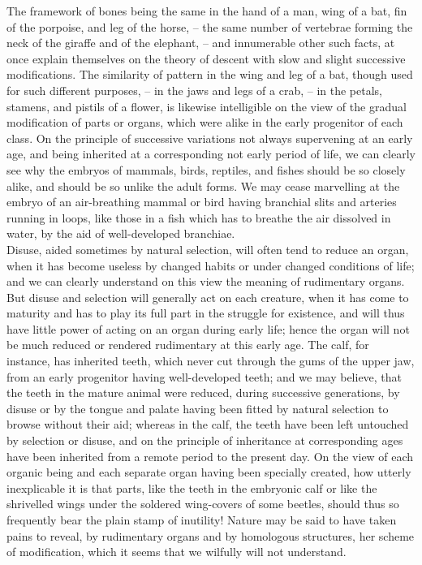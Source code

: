 \indent The framework of bones being the same in the hand of a man, wing of a bat, fin of the porpoise, and leg of the horse, -- the same number of vertebrae forming the neck of the giraffe and of the elephant, -- and innumerable other such facts, at once explain themselves on the theory of descent with slow and slight successive modifications. The similarity of pattern in the wing and leg of a bat, though used for such different purposes, -- in the jaws and legs of a crab, -- in the petals, stamens, and pistils of a flower, is likewise intelligible on the view of the gradual modification of parts or organs, which were alike in the early progenitor of each class. On the principle of successive variations not always supervening at an early age, and being inherited at a corresponding not early period of life, we can clearly see why the embryos of mammals, birds, reptiles, and fishes should be so closely alike, and should be so unlike the adult forms. We may cease marvelling at the embryo of an air-breathing mammal or bird having branchial slits and arteries running in loops, like those in a fish which has to breathe the air dissolved in water, by the aid of well-developed branchiae.~\\
\indent Disuse, aided sometimes by natural selection, will often tend to reduce an organ, when it has become useless by changed habits or under changed conditions of life; and we can clearly understand on this view the meaning of rudimentary organs. But disuse and selection will generally act on each creature, when it has come to maturity and has to play its full part in the struggle for existence, and will thus have little power of acting on an organ during early life; hence the organ will not be much reduced or rendered rudimentary at this early age. The calf, for instance, has inherited teeth, which never cut through the gums of the upper jaw, from an early progenitor having well-developed teeth; and we may believe, that the teeth in the mature animal were reduced, during successive generations, by disuse or by the tongue and palate having been fitted by natural selection to browse without their aid; whereas in the calf, the teeth have been left untouched by selection or disuse, and on the principle of inheritance at corresponding ages have been inherited from a remote period to the present day. On the view of each organic being and each separate organ having been specially created, how utterly inexplicable it is that parts, like the teeth in the embryonic calf or like the shrivelled wings under the soldered wing-covers of some beetles, should thus so frequently bear the plain stamp of inutility! Nature may be said to have taken pains to reveal, by rudimentary organs and by homologous structures, her scheme of modification, which it seems that we wilfully will not understand.~\\
